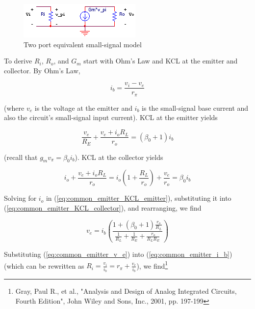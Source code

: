 \begin{figure}
	\centering
		\includegraphics{schematics/twoport_ss_model.PNG}
	\caption{Two port equivalent small-signal model}
	\label{fig:twoport_ss_model}
\end{figure}
\par
To derive $R_{i}$, $R_{o}$, and $G_{m}$ start with Ohm's Law and KCL at the emitter and collector. By Ohm's Law,

\begin{equation}
i_{b} = \frac{v_{i}-v_{e}}{r_{\pi}}
\label{eq:common_emitter_i_b}
\end{equation}

\noindent (where $v_{e}$ is the voltage at the emitter and $i_{b}$ is the small-signal base current and also the circuit's small-signal input current). KCL at the emitter yields

\begin{equation}
\frac{v_{e}}{R_{E}} + \frac{v_{e}+i_{o}R_{L}}{r_{o}} = (\beta_{0}+1)i_{b}
\label{eq:common_emitter_KCL_emitter}
\end{equation}

\noindent (recall that $g_{m}v_{\pi} = \beta_{0}i_{b}$). KCL at the collector yields

\begin{equation}
i_{o} + \frac{v_{e}+i_{o}R_{L}}{r_{o}} = i_{o}\left(1 + \frac{R_{L}}{r_{o}}\right) + \frac{v_{e}}{r_{o}} = \beta_{0}i_{b}
\label{eq:common_emitter_KCL_collector}
\end{equation}

\noindent Solving for $i_{o}$ in (\ref{eq:common_emitter_KCL_emitter}), substituting it into (\ref{eq:common_emitter_KCL_collector}), and rearranging, we find

\begin{equation}
v_{e} = i_{b}\left(\frac{1+(\beta_{0}+1)\frac{r_{o}}{R_{L}}}{\frac{1}{R_{L}} + \frac{1}{R_{E}} + \frac{r_{o}}{R_{L}R_{E}}}\right)
\label{eq:common_emitter_v_e}
\end{equation}

\noindent Substituting (\ref{eq:common_emitter_v_e}) into (\ref{eq:common_emitter_i_b}) (which can be rewritten as $R_{i} = \frac{v_{i}}{i_{b}} = r_{\pi} + \frac{v_{e}}{i_{b}}$), we find\footnote{Gray, Paul R., et al., "Analysis and Design of Analog Integrated Circuits, Fourth Edition", John Wiley and Sons, Inc., 2001, pp. 197-199}

